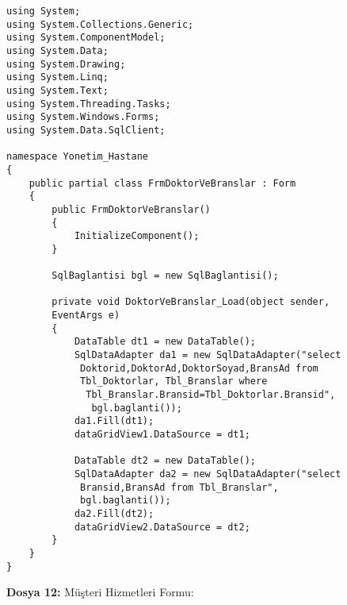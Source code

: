\begin{lstlisting}
using System;
using System.Collections.Generic;
using System.ComponentModel;
using System.Data;
using System.Drawing;
using System.Linq;
using System.Text;
using System.Threading.Tasks;
using System.Windows.Forms;
using System.Data.SqlClient;

namespace Yonetim_Hastane
{
    public partial class FrmDoktorVeBranslar : Form
    {
        public FrmDoktorVeBranslar()
        {
            InitializeComponent();
        }

        SqlBaglantisi bgl = new SqlBaglantisi();

        private void DoktorVeBranslar_Load(object sender, 
        EventArgs e)
        {
            DataTable dt1 = new DataTable();
            SqlDataAdapter da1 = new SqlDataAdapter("select
             Doktorid,DoktorAd,DoktorSoyad,BransAd from 
             Tbl_Doktorlar, Tbl_Branslar where
              Tbl_Branslar.Bransid=Tbl_Doktorlar.Bransid",
               bgl.baglanti());
            da1.Fill(dt1);
            dataGridView1.DataSource = dt1;

            DataTable dt2 = new DataTable();
            SqlDataAdapter da2 = new SqlDataAdapter("select
             Bransid,BransAd from Tbl_Branslar", 
             bgl.baglanti());
            da2.Fill(dt2);
            dataGridView2.DataSource = dt2;
        }
    }
}
\end{lstlisting}

\textbf{Dosya 12:} Müşteri Hizmetleri Formu:

